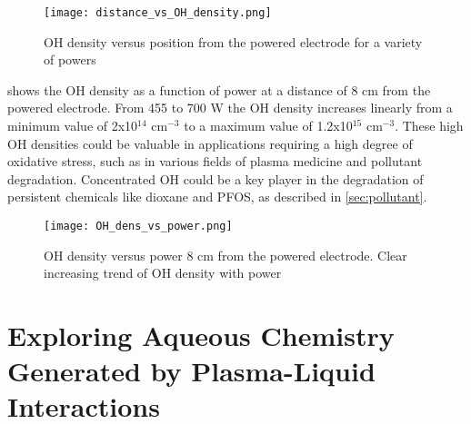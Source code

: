 \begin{figure}[htbp]
  \centering
  \texttt{[image: distance\_vs\_OH\_density.png]}
  \caption{OH density versus position from the powered electrode for a variety of powers}
  \label{fig:OH_dist}
\end{figure}

 shows the OH density as a function of power at a distance of 8 cm from the powered electrode. From 455 to 700 W the OH density increases linearly from a minimum value of 2x10$^{14}$ cm$^{-3}$ to a maximum value of 1.2x10$^{15}$ cm$^{-3}$. These high OH densities could be valuable in applications requiring a high degree of oxidative stress, such as in various fields of plasma medicine and pollutant degradation. Concentrated OH could be a key player in the degradation of persistent chemicals like dioxane and PFOS, as described in \cref{sec:pollutant}.

\begin{figure}[htbp]
  \centering
  \texttt{[image: OH\_dens\_vs\_power.png]}
  \caption{OH density versus power 8 cm from the powered electrode. Clear increasing trend of OH density with power}
  \label{fig:OH_pow}
\end{figure}

\section{Exploring Aqueous Chemistry Generated by Plasma-Liquid Interactions}
\label{sec:aq_chem}

